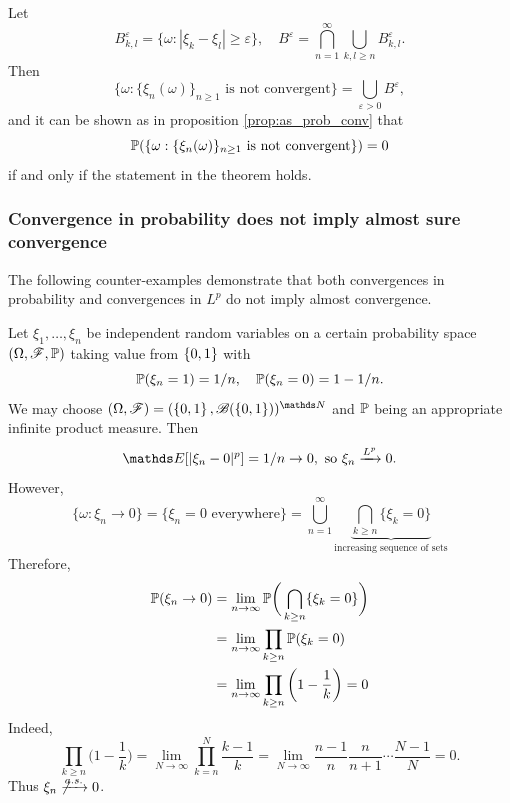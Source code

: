 \begin{hint}
Let
\begin{equation*}
    B_{k,l}^\varepsilon = \{ \omega: |\xi_k - \xi_l| \ge \varepsilon\} , \quad B^\varepsilon = \bigcap_{n=1}^\infty \bigcup_{k, l \ge n} B_{k,l}^\varepsilon.
\end{equation*}
Then 
$$\{ \omega: \{\xi_n(\omega) \}_{n\ge1} \text{ is not convergent} \} = \bigcup_{\varepsilon > 0}B^\varepsilon,$$ 
and it can be shown as in proposition \ref{prop:as_prob_conv} that 
$$\mathbb{P}(\{ \omega: \{\xi_n(\omega) \}_{n\ge1} \text{ is not convergent} \}) = 0$$ 
if and only if the statement in the theorem holds.
\end{hint}

\subsubsection{Convergence in probability does not imply almost sure convergence}

The following counter-examples demonstrate that both convergences in probability and convergences in $L^p$ do not imply almost convergence. 

\begin{example}
Let $\xi_1, \dots, \xi_n$ be independent random variables on a certain probability space $(\Omega,\mathcal{F},\mathbb{P})$ taking value from $\left\{ 0,1 \right \}$ with
\begin{equation*}
    \mathbb{P}(\xi_n = 1) = 1/n, \quad \mathbb{P}(\xi_n = 0) = 1 - 1/n.
\end{equation*}
We may choose $(\Omega,\F) = (\set{0,1}, \B(\set{0,1}))^{\N}$ and $\mathbb{P}$ being an appropriate infinite product measure. Then
\begin{equation*}
    \E[|\xi_n - 0|^p] = 1/n \to 0, \text{ so } \xi_n \xrightarrow{L^p} 0.
\end{equation*}
However, 
\begin{equation*}
    \{ \omega: \xi_n \to 0 \} = \{ \xi_n = 0 \text{ everywhere} \} = \bigcup_{n=1}^\infty \underbrace{\bigcap_{k \ge n} \{ \xi_k = 0 \}}_{\text{increasing sequence of sets}}
\end{equation*}
Therefore, 
\begin{align*}
    \mathbb{P}(\xi_n \to 0) &= \lim_{n \to \infty} \mathbb{P} \bigg(\bigcap_{k\ge n} \{ \xi_k = 0\} \bigg)\\
    &= \lim_{n \to \infty} \prod_{k \ge n} \mathbb{P}(\xi_k = 0)\\
    &= \lim_{n \to \infty} \prod_{k \ge n} \bigg(1 - \frac{1}{k}\bigg) = 0
\end{align*}
Indeed,
\begin{equation*}
    \prod_{k \ge n} \bigg( 1- \frac{1}{k} \bigg) = \lim_{N \to \infty} \prod_{k=n}^N \frac{k-1}{k} = \lim_{N \to \infty} \frac{n-1}{n} \frac{n}{n+1} \cdots \frac{N-1}{N} = 0.
\end{equation*}
Thus $\xi_n \not \xrightarrow{a.s.} 0$.
\end{example}

